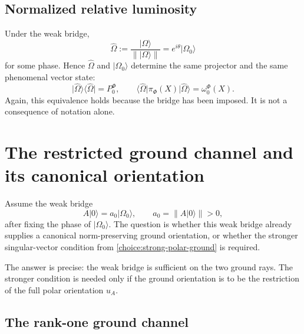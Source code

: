 \documentclass[11pt,reqno]{scrartcl}
\newcommand{\piF}{\pi_{\Phi}}
\newcommand{\omegaF}{\omega_{0}^{\Phi}}
\newcommand{\PzeroF}{P_{0}^{\Phi}}
\newcommand{\ket}[1]{\lvert #1\rangle}
\newcommand{\bra}[1]{\langle #1\rvert}
\newcommand{\proj}[1]{\ket{#1}\!\bra{#1}}
\theoremstyle{plain}
\theoremstyle{definition}
\theoremstyle{remark}
\begin{document}
\subsection{Normalized relative luminosity}

Under the weak bridge,
\begin{equation}
  \widehat\Omega
  :=\frac{\ket\Omega}{\|\ket\Omega\|}
  =e^{i\theta}\ket{\Omega_0}
\end{equation}
for some phase.  Hence $\widehat\Omega$ and $\ket{\Omega_0}$ determine the
same projector and the same phenomenal vector state:
\begin{equation}
  \proj{\widehat\Omega}=\PzeroF,
  \qquad
  \bra{\widehat\Omega}\piF(X)\ket{\widehat\Omega}
  =\omegaF(X).
\end{equation}
Again, this equivalence holds because the bridge has been imposed.  It is not
a consequence of notation alone.
\section{The restricted ground channel and its canonical orientation}
\label{sec:ground-channel-orientation}

Assume the weak bridge
\begin{equation}
  A\ket0=a_0\ket{\Omega_0},
  \qquad
  a_0=\|A\ket0\|>0,
  \label{eq:ground-bridge-fixed}
\end{equation}
after fixing the phase of \(\ket{\Omega_0}\).  The question is whether this
weak bridge already supplies a canonical norm-preserving ground orientation,
or whether the stronger singular-vector condition from
\cref{choice:strong-polar-ground} is required.

The answer is precise: the weak bridge is sufficient on the two ground rays.
The stronger condition is needed only if the ground orientation is to be the
restriction of the full polar orientation \(u_A\).

\subsection{The rank-one ground channel}
\end{document}
